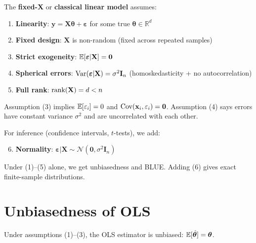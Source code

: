 \documentclass[main.tex]{subfiles}
\begin{document}
\begin{definition}
The \textbf{fixed-X} or \textbf{classical linear model} assumes:
\begin{enumerate}
    \item \textbf{Linearity}: $\mathbf{y} = \mathbf{X}\boldsymbol{\theta} + \boldsymbol{\varepsilon}$ for some true $\boldsymbol{\theta} \in \mathbb{R}^d$
    \item \textbf{Fixed design}: $\mathbf{X}$ is non-random (fixed across repeated samples)
    \item \textbf{Strict exogeneity}: $\mathbb{E}[\boldsymbol{\varepsilon} | \mathbf{X}] = \mathbf{0}$
    \item \textbf{Spherical errors}: $\text{Var}(\boldsymbol{\varepsilon} | \mathbf{X}) = \sigma^2 \mathbf{I}_n$ (homoskedasticity + no autocorrelation)
    \item \textbf{Full rank}: $\text{rank}(\mathbf{X}) = d < n$
\end{enumerate}
\end{definition}

Assumption (3) implies $\mathbb{E}[\varepsilon_i] = 0$ and $\text{Cov}(\mathbf{x}_i, \varepsilon_i) = \mathbf{0}$. Assumption (4) says errors have constant variance $\sigma^2$ and are uncorrelated with each other.

\begin{remark}
For inference (confidence intervals, $t$-tests), we add:
\begin{enumerate}
    \setcounter{enumi}{5}
    \item \textbf{Normality}: $\boldsymbol{\varepsilon} | \mathbf{X} \sim \mathcal{N}(\mathbf{0}, \sigma^2 \mathbf{I}_n)$
\end{enumerate}
Under (1)--(5) alone, we get unbiasedness and BLUE. Adding (6) gives exact finite-sample distributions.
\end{remark}

\needspace{0.33\textheight}
\section{Unbiasedness of OLS}

\begin{theorem}[Unbiasedness]
Under assumptions (1)--(3), the OLS estimator is unbiased: $\mathbb{E}[\hat{\boldsymbol{\theta}}] = \boldsymbol{\theta}$.
\end{theorem}
\end{document}
